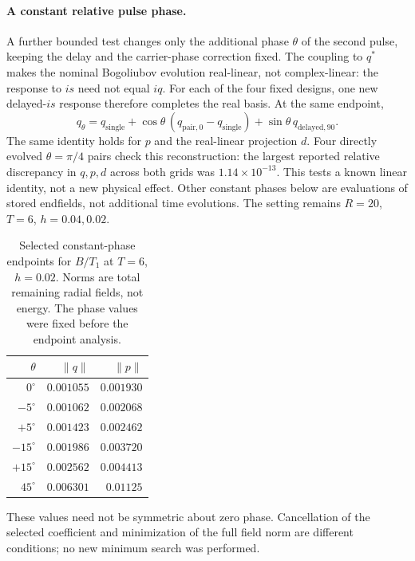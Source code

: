 \paragraph{A constant relative pulse phase.}
A further bounded test changes only the additional phase $\theta$ of the
second pulse, keeping the delay and the carrier-phase correction fixed.
The coupling to $q^*$ makes the nominal Bogoliubov evolution real-linear,
not complex-linear: the response to $i s$ need not equal $i q$.
For each of the four fixed designs, one new delayed-$i s$ response
therefore completes the real basis. At the same endpoint,
\begin{equation}
 q_\theta=q_{\mathrm{single}}
   +\cos\theta\,(q_{\mathrm{pair},0}-q_{\mathrm{single}})
   +\sin\theta\,q_{\mathrm{delayed},90}.
 \label{eq:phase-real-basis}
\end{equation}
The same identity holds for $p$ and the real-linear projection $d$.
Four directly evolved $\theta=\pi/4$ pairs check this reconstruction:
the largest reported relative discrepancy in $q,p,d$ across both grids
was $1.14\times10^{-13}$. This tests a known linear identity, not a new
physical effect. Other constant phases below are evaluations of stored
endfields, not additional time evolutions. The setting remains
$R=20$, $T=6$, $h=0.04,0.02$.

\begin{table}[htbp]\centering\small
\caption{Selected constant-phase endpoints for $B/T_1$ at $T=6$,
$h=0.02$. Norms are total remaining radial fields, not energy.
The phase values were fixed before the endpoint analysis.}
\label{tab:phase-selected}
\begin{tabular}{rrr}\toprule
$\theta$&$\|q\|$&$\|p\|$\\\midrule
$0^\circ$&$0.001055$&$0.001930$\\
$-5^\circ$&$0.001062$&$0.002068$\\
$+5^\circ$&$0.001423$&$0.002462$\\
$-15^\circ$&$0.001986$&$0.003720$\\
$+15^\circ$&$0.002562$&$0.004413$\\
$45^\circ$&$0.006301$&$0.01125$\\\bottomrule
\end{tabular}
\end{table}
These values need not be symmetric about zero phase. Cancellation of the
selected coefficient and minimization of the full field norm are different
conditions; no new minimum search was performed.

